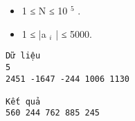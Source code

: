\begin{itemize}
	\item     1 ≤ N ≤ 10    $^     5    $    .   
	\item     1 ≤ |a    $_     i    $    | ≤ 5000.   
\end{itemize}
\begin{verbatim}
Dữ liệu
5
2451 -1647 -244 1006 1130

Kết quả
560 244 762 885 245	
\end{verbatim}
